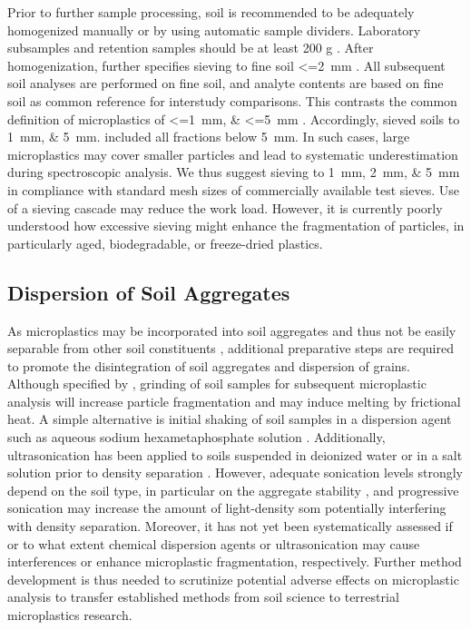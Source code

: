 Prior to further sample processing, soil is recommended to be adequately homogenized manually or by using automatic sample dividers. Laboratory subsamples and retention samples should be at least 200 g \citep{ISO11464Soil2006}. After homogenization, \citet{ISO11464Soil2006} further specifies sieving to fine soil \SI{<=2}{\milli\meter} \citep{ZubrisSynthetic2005,ZhangSimple2018}.
All subsequent soil analyses are performed on fine soil, and analyte contents are based on fine soil as common reference for interstudy comparisons. This contrasts the common definition of microplastics of \SIlist{<=1;<=5}{\milli\meter} \citep{HartmannAre2019,BraunMicroplastics2018}. Accordingly, \citet{PiehlIdentification2018} sieved soils to \SIlist{1;5}{\milli\meter}.  included all fractions below \SI{5}{\milli\meter}. In such cases, large microplastics may cover smaller particles and lead to systematic underestimation during spectroscopic analysis. We thus suggest sieving to \SIlist{1;2;5}{\milli\meter} in compliance with standard mesh sizes of commercially available test sieves. Use of a sieving cascade may reduce the work load. However, it is currently poorly understood how excessive sieving might enhance the fragmentation of particles, in particularly aged, biodegradable, or freeze-dried plastics.

\subsection{Dispersion of Soil Aggregates}
\label{sec:analytical-techniques:dispersion}

As microplastics may be incorporated into soil aggregates and thus not be easily separable from other soil constituents \citep{ZhangSimple2018}, additional preparative steps are required to promote the disintegration of soil aggregates and dispersion of grains. Although specified by \citet{ISO11464Soil2006}, grinding of soil samples for subsequent microplastic analysis will increase particle fragmentation and may induce melting by frictional heat. A simple alternative is initial shaking of soil samples in a dispersion agent such as aqueous sodium hexametaphosphate solution \citep{Garces-OrdonezMarine2019,VermaireMicroplastic2017,ZhouMicroplastics2020}.
Additionally, ultrasonication has been applied to soils suspended in deionized water \citep{ZhangDistribution2018,ZhangSimple2018} or in a salt solution prior to density separation \citep{LiuMicroplastic2018}. However, adequate sonication levels strongly depend on the soil type, in particular on the aggregate stability \citep{CerliSeparation2012}, and progressive sonication may increase the amount of light-density \ac{som} potentially interfering with density separation. Moreover, it has not yet been systematically assessed if or to what extent chemical dispersion agents or ultrasonication may cause interferences or enhance microplastic fragmentation, respectively.
Further method development is thus needed to scrutinize potential adverse effects on microplastic analysis to transfer established methods from soil science to terrestrial microplastics research.

